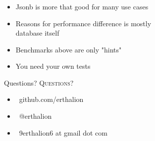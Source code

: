 \documentclass[usenames,dvipsnames, 18pt, compress, aspectratio=169]{beamer}
\def\twitter{{\FA \faTwitter}}
\def\github{{\FA \faGithub}}
\def\email{{\FA \faEnvelope}}
\begin{document}

\begin{frame}[fragile]
    \frametitle{}
    \vspace{10pt}
    \begin{itemize}[leftmargin=*, label={\MVRightarrow}]
        \item <+-> Jsonb is more that good for many use cases
        \item <+-> Reasons for performance difference is mostly \\database itself
        \item <+-> Benchmarks above are only "hints"
        \item <+-> You need your own tests
    \end{itemize}
\end{frame}

\fontsize{17pt}{18}\selectfont
\begin{frame}
  \vspace*{2.5cm}
  \begin{minipage}[b][\paperheight]{\textwidth}
  \begin{center}

      \linespread{1.0}%
      \if@noSmallCapitals%
        Questions?
      \else%
        \scshape{\color{black} Questions?}%
      \fi%
      \vspace*{0.3em}

      \fontsize{13pt}{14}\selectfont
        \begin{itemize}[label={}]
            \item {\color{black} \github\ github.com/erthalion}
            \item {\color{black} \twitter\ @erthalion}
            \item {\color{black}\email\ 9erthalion6 at gmail dot com}
        \end{itemize}
      \vspace*{2.5em}%

    \vfill
    \vspace*{2em}
  \end{center}
  \end{minipage}

\end{frame}
\end{document}
